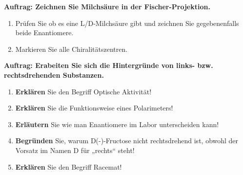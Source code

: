 \documentclass{scrartcl}  %
\begin{document}
\vspace{0.3cm}
			\noindent \textbf{Auftrag: Zeichnen Sie Milchsäure in der Fischer-Projektion.}
			\begin{enumerate}
				\item Prüfen Sie ob es eine L/D-Milchsäure gibt und zeichnen Sie gegebenenfalls beide Enantiomere. 
    			\item Markieren Sie alle Chiralitätszentren.
			\end{enumerate} 

			\noindent \textbf{Auftrag: Erabeiten Sie sich die Hintergründe von links- bzw. rechtsdrehenden Substanzen.}
			\begin{enumerate}
			\item \textbf{Erklären} Sie den Begriff Optische Aktivität!
		    \item \textbf{Erklären} Sie die Funktionsweise eines Polarimeters!
		    \item \textbf{Erläutern} Sie wie man Enantiomere im Labor unterscheiden kann!
		    \item \textbf{Begründen} Sie, warum D(-)-Fructose nicht rechtsdrehend ist, obwohl der Vorsatz im Namen D für „rechts“ steht!
		    \item \textbf{Erklären} Sie den Begriff Racemat!
			\end{enumerate}
\end{document}

